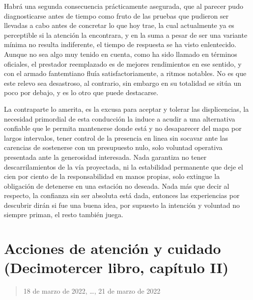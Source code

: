 \documentclass[
]{book}
\begin{document}
Habrá una segunda consecuencia prácticamente asegurada, que al parecer pudo diagnosticarse antes de tiempo como fruto de las pruebas que pudieron ser llevadas a cabo antes de concretar lo que hoy trae, la cual actualmente ya es perceptible si la atención la encontrara, y en la suma a pesar de ser una variante mínima no resulta indiferente, el tiempo de respuesta se ha visto enlentecido. Aunque no sea algo muy tenido en cuenta, como ha sido llamado en términos oficiales, el prestador reemplazado es de mejores rendimientos en ese sentido, y con el armado fantemtiano fluía satisfactoriamente, a ritmos notables. No es que este relevo sea desastroso, al contrario, sin embargo en su totalidad se sitúa un poco por debajo, y es lo otro que puede destacarse.

La contraparte lo amerita, es la excusa para aceptar y tolerar las displicencias, la necesidad primordial de esta conducción la induce a acudir a una alternativa confiable que le permita mantenerse donde está y no desaparecer del mapa por largos intervalos, tener control de la presencia en linea sin socavar ante las carencias de sostenerse con un presupuesto nulo, solo voluntad operativa presentada ante la generosidad interesada. Nada garantiza no tener descarrilamientos de la vía proyectada, ni la estabilidad permanente que deje el cien por ciento de la responsabilidad en manos propias, solo extingue la obligación de detenerse en una estación no deseada. Nada más que decir al respecto, la confianza sin ser absoluta está dada, entonces las experiencias por descubrir dirán si fue una buena idea, por supuesto la intención y voluntad no siempre priman, el resto también juega.

\hypertarget{acciones-de-atenciuxf3n-y-cuidado-decimotercer-libro-capuxedtulo-ii}{%
\section{Acciones de atención y cuidado (Decimotercer libro, capítulo II)}\label{acciones-de-atenciuxf3n-y-cuidado-decimotercer-libro-capuxedtulo-ii}}

\begin{quote}
18 de marzo de 2022, \ldots, 21 de marzo de 2022
\end{quote}
\end{document}
